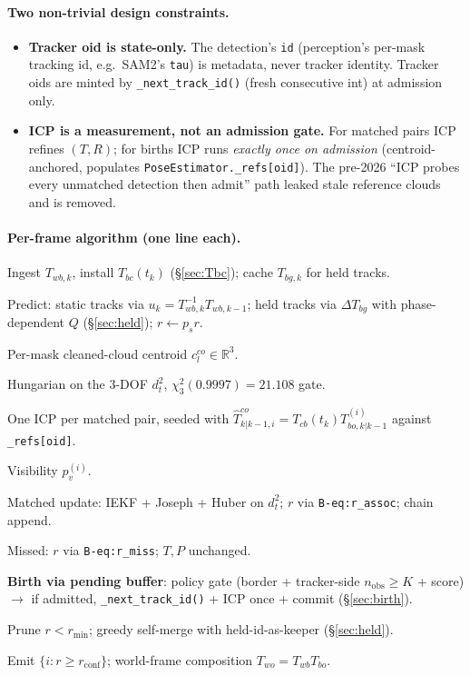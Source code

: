 \documentclass[11pt]{article}
\newcommand{\R}{\mathbb{R}}
\newcommand{\code}[1]{\texttt{\small #1}}
\begin{document}
\paragraph{Two non-trivial design constraints.}
\begin{itemize}[leftmargin=1.5em,itemsep=0pt,topsep=2pt]
\item \textbf{Tracker oid is state-only.} The detection's \code{id}
   (perception's per-mask tracking id, e.g.\ SAM2's \code{tau}) is
   metadata, never tracker identity. Tracker oids are minted by
   \code{\_next\_track\_id()} (fresh consecutive int) at admission only.
\item \textbf{ICP is a measurement, not an admission gate.} For matched
   pairs ICP refines $(T,R)$; for births ICP runs \emph{exactly once
   on admission} (centroid-anchored, populates
   \code{PoseEstimator.\_refs[oid]}). The pre-2026 ``ICP probes every
   unmatched detection then admit'' path leaked stale reference clouds
   and is removed.
\end{itemize}

\paragraph{Per-frame algorithm (one line each).}
\begin{description}[leftmargin=2em,style=nextline,itemsep=2pt,topsep=2pt]
\item[\textbf{0.}] Ingest $T_{wb,k}$, install $T_{bc}(t_k)$
   (\S\ref{sec:Tbc}); cache $T_{bg,k}$ for held tracks.
\item[\textbf{1.}] Predict: static tracks via $u_k=T_{wb,k}^{-1}T_{wb,k-1}$;
   held tracks via $\Delta T_{bg}$ with phase-dependent $Q$
   (\S\ref{sec:held}); $r\!\leftarrow\!p_s r$.
\item[\textbf{2.}] Per-mask cleaned-cloud centroid $c^{co}_l\in\R^3$.
\item[\textbf{3.}] Hungarian on the 3-DOF $d^2_t$, $\chi^2_3(0.9997)=21.108$ gate.
\item[\textbf{3b.}] One ICP per matched pair, seeded with
   $\hat T^{co}_{k|k-1,i}=T_{cb}(t_k)T_{bo,k|k-1}^{(i)}$ against
   \code{\_refs[oid]}.
\item[\textbf{4.}] Visibility $p_v^{(i)}$.
\item[\textbf{5.}] Matched update: IEKF + Joseph + Huber on $d^2_t$;
   $r$ via \code{B-eq:r\_assoc}; chain append.
\item[\textbf{6.}] Missed: $r$ via \code{B-eq:r\_miss}; $T,P$ unchanged.
\item[\textbf{7.}] \textbf{Birth via pending buffer}:
   policy gate (border + tracker-side $n_{\text{obs}}\!\ge\!K$ + score)
   $\to$ if admitted, \code{\_next\_track\_id()} + ICP once + commit
   (\S\ref{sec:birth}).
\item[\textbf{8.}] Prune $r<r_{\min}$; greedy self-merge with
   held-id-as-keeper (\S\ref{sec:held}).
\item[\textbf{9.}] Emit $\{i:r\!\ge\!r_{\text{conf}}\}$; world-frame
   composition $T_{wo}\!=\!T_{wb}T_{bo}$.
\end{description}
\end{document}
